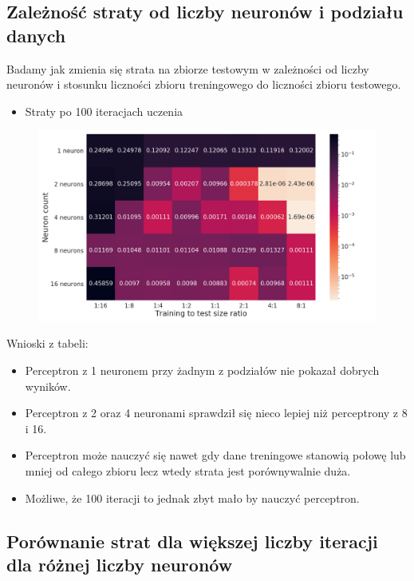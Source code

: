 \documentclass[12pt,a4paper]{article}
\begin{document}
\pagebreak

\subsection{Zależność straty od liczby neuronów i podziału danych}

Badamy jak zmienia się strata na zbiorze testowym w zależności od liczby neuronów i stosunku liczności zbioru treningowego do liczności zbioru testowego.

\begin{itemize}
  \item   Straty po 100 iteracjach uczenia
\end{itemize}

\begin{figure}[h]
  \centering
  \includegraphics[width=1.0\textwidth]{charts/double_activation/neuron_partition_heattable.png}
  \caption{}
  \label{}
\end{figure}

Wnioski z tabeli:

\begin{itemize}
  \item   Perceptron z 1 neuronem przy żadnym z podziałów nie pokazał dobrych wyników.
  \item   Perceptron z 2 oraz 4 neuronami sprawdził się nieco lepiej niż perceptrony z 8 i 16.
  \item   Perceptron może nauczyć się nawet gdy dane treningowe stanowią połowę lub mniej od całego zbioru lecz wtedy strata jest porównywalnie duża.
  \item   Możliwe, że 100 iteracji to jednak zbyt mało by nauczyć perceptron.
\end{itemize}

\pagebreak

\subsection{Porównanie strat dla większej liczby iteracji dla różnej liczby neuronów}
\end{document}
